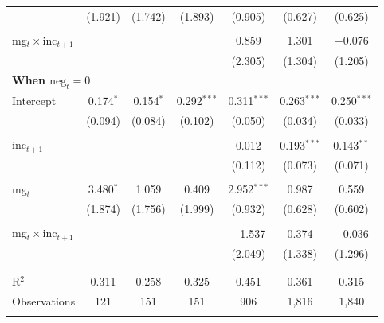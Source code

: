 \documentclass[letter,12pt]{article}
\newcommand{\mc}{\multicolumn}
\begin{document}
\begin{table}
\begin{tabular}{@{\extracolsep{5pt}}lcccccc}
    &       (1.921) &       (1.742) &       (1.893) &        (0.905) &       (0.627) &       (0.625) \\
    & & & & & & \\ [-2.5ex]
    mg$_{t}\times$inc$_{t+1}$ &               &               &               &          0.859 &         1.301 &      $-$0.076 \\
    &               &               &               &        (2.305) &       (1.304) &       (1.205) \\
    \mc{2}{l}{\textbf{When $\text{neg}_t=0$}} & & & & & \\
    Intercept &   0.174$^{*}$ &   0.154$^{*}$ & 0.292$^{***}$ &  0.311$^{***}$ & 0.263$^{***}$ & 0.250$^{***}$ \\
    &       (0.094) &       (0.084) &       (0.102) &        (0.050) &       (0.034) &       (0.033) \\
    & & & & & & \\ [-2.5ex]
    inc$_{t+1}$    &               &               &               &          0.012 & 0.193$^{***}$ &  0.143$^{**}$ \\
    &               &               &               &        (0.112) &       (0.073) &       (0.071) \\
    & & & & & & \\ [-2.5ex]
    mg$_{t}$     &   3.480$^{*}$ &         1.059 &         0.409 &  2.952$^{***}$ &         0.987 &         0.559 \\
    &       (1.874) &       (1.756) &       (1.999) &        (0.932) &       (0.628) &       (0.602) \\
    & & & & & & \\ [-2.5ex]
    mg$_{t}\times$inc$_{t+1}$  &               &               &               &       $-$1.537 &         0.374 &      $-$0.036 \\
    &               &               &               &        (2.049) &       (1.338) &       (1.296) \\
    & & & & & & \\ [-2.5ex]
    \hline \\[-1.8ex] 
    R$^2$          &         0.311 &         0.258 &         0.325 &          0.451 &         0.361 &         0.315 \\
    Observations   &           121 &           151 &           151 &            906 &         1,816 &         1,840 \\
    & & & & & & \\ [-2.5ex]

\end{tabular}
\end{table}
\end{document}
